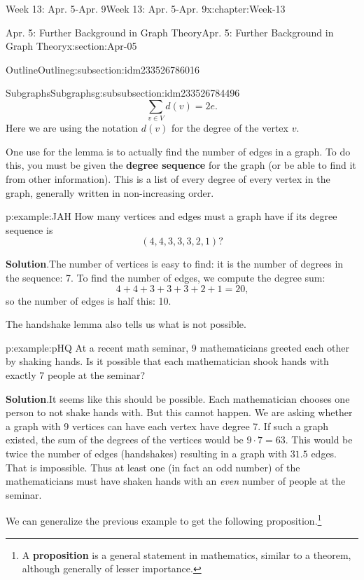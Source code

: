 \documentclass[oneside,10pt,]{book}
\newcommand{\blocktitlefont}{\relax}
\newcommand{\terminology}[1]{\textbf{#1}}
\numberwithin{equation}{section}
\begin{document}
\begin{chapterptx}{Week 13: Apr. 5-Apr. 9}{}{Week 13: Apr. 5-Apr. 9}{}{}{x:chapter:Week-13}
\begin{sectionptx}{Apr. 5: Further Background in Graph Theory}{}{Apr. 5: Further Background in Graph Theory}{}{}{x:section:Apr-05}
\begin{subsectionptx}{Outline}{}{Outline}{}{}{g:subsection:idm233526786016}
\begin{subsubsectionptx}{Subgraphs}{}{Subgraphs}{}{}{g:subsubsection:idm233526784496}
\begin{equation*}
\sum_{v\in V} d(v) = 2e\text{.}
\end{equation*}
Here we are using the notation \(d(v)\) for the degree of the vertex \(v\).%
\par
{} One use for the lemma is to actually find the number of edges in a graph.  To do this, you must be given the \terminology{degree sequence} for the graph (or be able to find it from other information).  This is a list of every degree of every vertex in the graph, generally written in non-increasing order.%
\begin{example}{}{p:example:JAH}%
How many vertices and edges must a graph have if its degree sequence is%
\begin{equation*}
(4, 4, 3, 3, 3, 2, 1)\text{?}
\end{equation*}
%
\par\smallskip%
\noindent\textbf{\blocktitlefont Solution}.\hypertarget{p:solution:PZN}{}\quad{}The number of vertices is easy to find: it is the number of degrees in the sequence: 7.  To find the number of edges, we compute the degree sum:%
\begin{equation*}
4 + 4 + 3 + 3 + 3 + 2 + 1 = 20\text{,}
\end{equation*}
so the number of edges is half this: 10.%
\end{example}
The handshake lemma also tells us what is not possible.%
\begin{example}{}{p:example:pHQ}%
At a recent math seminar, 9 mathematicians greeted each other by shaking hands. Is it possible that each mathematician shook hands with exactly 7 people at the seminar?%
\par\smallskip%
\noindent\textbf{\blocktitlefont Solution}.\hypertarget{p:solution:wgW}{}\quad{}It seems like this should be possible. Each mathematician chooses one person to not shake hands with. But this cannot happen. We are asking whether a graph with 9 vertices can have each vertex have degree 7. If such a graph existed, the sum of the degrees of the vertices would be \(9\cdot 7 = 63\). This would be twice the number of edges (handshakes) resulting in a graph with \(31.5\) edges. That is impossible. Thus at least one (in fact an odd number) of the mathematicians must have shaken hands with an \emph{even} number of people at the seminar.%
\end{example}
We can generalize the previous example to get the following proposition.\footnote{A \terminology{proposition} is a general statement in mathematics, similar to a theorem, although generally of lesser importance.\label{g:fn:idm233526731952}}%

\end{subsubsectionptx}
\end{subsectionptx}
\end{sectionptx}
\end{chapterptx}
\end{document}
